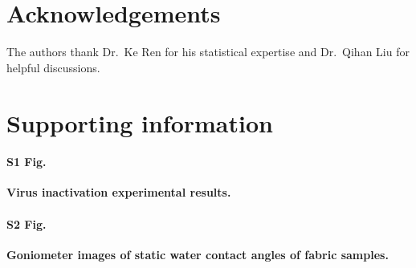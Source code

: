 \documentclass[10pt,letterpaper]{article}
\begin{document}
\section*{Acknowledgements}

The authors thank Dr.~Ke Ren for his statistical expertise and Dr.~Qihan Liu for helpful discussions. 


\section*{Supporting information}

\paragraph*{S1 Fig.}
\label{S1_Fig}
{\bf Virus inactivation experimental results.}

\paragraph*{S2 Fig.}
\label{S2_Fig}
{\bf Goniometer images of static water contact angles of fabric samples.}
\end{document}
